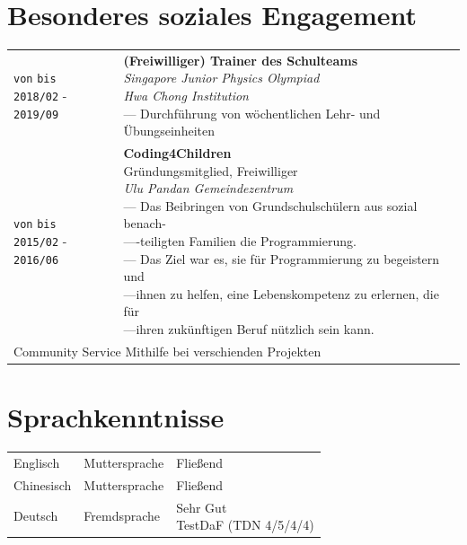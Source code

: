 \documentclass[11pt]{article}
\newcommand{\job}[1]{\textbf{#1}}
\begin{document}
\section{\textcolor{section_3}{Besonderes soziales Engagement}}
	\begin{center}
		\renewcommand{\arraystretch}{1.3}
		\renewcommand{\cellalign}{lt}
		\begin{tabularx}{0.9\textwidth}{  p{4cm}  X  }
			\makecell{\texttt{\footnotesize von} \hspace{2.4em} \texttt{\footnotesize bis} \\ \texttt{2018{\footnotesize /02}} - \texttt{2019{\footnotesize /09}}} & \makecell{\job{(Freiwilliger) Trainer des Schulteams}\\ \textit{\small Singapore Junior Physics Olympiad}
			\\ {\small \textcolor{dark_gray}{\textit{Hwa Chong Institution}}} \\ --- {\footnotesize Durchführung von wöchentlichen Lehr- und Übungseinheiten} 
			}  \\
			\makecell{\texttt{\footnotesize von} \hspace{2.4em} \texttt{\footnotesize bis} \\ \texttt{2015{\footnotesize /02}} - \texttt{2016{\footnotesize /06}}} & \makecell{\job{Coding4Children} \\ {\small Gründungsmitglied, Freiwilliger} 
			\\ {\small \textcolor{dark_gray}{\textit{Ulu Pandan Gemeindezentrum}}} \\
			--- {\footnotesize Das Beibringen von Grundschulschülern aus sozial benach-}\\
			{\transparent{0} ---}{\footnotesize -teiligten Familien die Programmierung.} \\
			--- {\footnotesize Das Ziel war es, sie für Programmierung zu begeistern und} \\
			{\transparent{0} ---}{\footnotesize ihnen zu helfen, eine Lebenskompetenz zu erlernen, die für} \\
			{\transparent{0} ---}{\footnotesize ihren zukünftigen Beruf nützlich sein kann.}
			} \\
			\multicolumn{2}{l}{Community Service Mithilfe bei verschienden Projekten}
		\end{tabularx}
	\end{center}
\section{\textcolor{section_4}{Sprachkenntnisse}}
	\begin{center}
		\renewcommand{\arraystretch}{1.3}
		\renewcommand{\cellalign}{lt}
		\begin{tabularx}{0.9\textwidth}{p{3cm}p{3cm} X}
			Englisch & Muttersprache & Fließend \\
			Chinesisch & Muttersprache & Fließend \\
			Deutsch & Fremdsprache & \makecell{Sehr Gut\\TestDaF (TDN 4/5/4/4)}
		\end{tabularx}
	\end{center}
\end{document}
